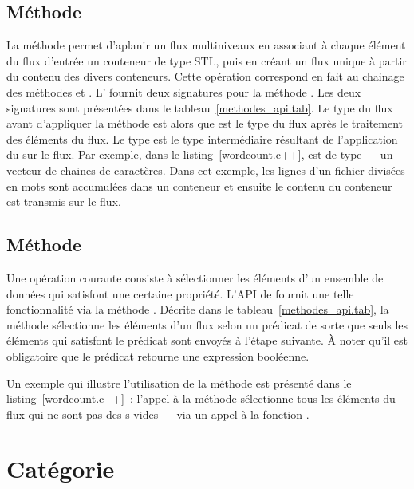 \subsection{M\'ethode }

La m\'ethode   permet d'aplanir un flux multiniveaux en associant \`a chaque \'el\'ement du flux d'entr\'ee un conteneur de type STL, puis en cr\'eant un flux unique \`a partir du contenu des divers conteneurs. Cette op\'eration correspond en fait au chainage des m\'ethodes  et . L' fournit deux signatures pour la m\'ethode . Les deux signatures sont pr\'esent\'ees dans le tableau~\ref{methodes_api.tab}. Le type du flux avant d'appliquer la m\'ethode  est  alors que  est le type du flux apr\`es le traitement des \'el\'ements du flux. Le type  est le type interm\'ediaire r\'esultant de l'application du  sur le flux. Par exemple, dans le listing~\ref{wordcount.c++},  est de type  --- un vecteur de chaines de caract\`eres. Dans cet exemple, les lignes d'un fichier divis\'ees en mots sont accumul\'ees dans un conteneur et ensuite le contenu du conteneur est transmis sur le flux.


\subsection{M\'ethode }
Une op\'eration courante consiste \`a s\'electionner les \'el\'ements d'un ensemble de donn\'ees qui satisfont une certaine propri\'et\'e. L'API de  fournit une telle fonctionnalit\'e via la m\'ethode . D\'ecrite dans le tableau~\ref{methodes_api.tab}, la m\'ethode  s\'electionne les \'el\'ements d'un flux selon un pr\'edicat de sorte que seuls les \'el\'ements qui  satisfont le pr\'edicat sont envoy\'es \`a l'\'etape suivante. \`A noter qu'il est obligatoire que le pr\'edicat retourne une expression bool\'eenne. 

Un exemple qui illustre l'utilisation de la m\'ethode  est pr\'esent\'e dans le listing~\ref{wordcount.c++}~: l'appel \`a la m\'ethode   s\'electionne tous les \'el\'ements du flux qui ne sont pas des s vides --- via un appel \`a la fonction .


\section{Cat\'egorie }

